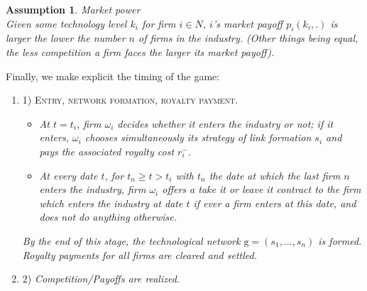 \documentclass{article}
\newtheorem{assumption}{Assumption}
\begin{document}
\begin{assumption}{Market power}\label{ass3}\\
Given some technology level $k_i$ for firm $i\in N$, $i$'s market payoff $p_i(k_i,.)$ is larger the lower the number $n$ of firms in the industry. (Other things being equal, the less competition a firm faces the larger its market payoff). 
\end{assumption}

\indent Finally, we make explicit the timing of the game:       

\begin{enumerate}
    \item[] \textsc{1) Entry, network formation, royalty payment.}
\begin{itemize}
\item  \textit{At $t=t_i$, firm $\omega_i$ decides whether it enters the industry or not; if it enters, $\omega_i$ chooses simultaneously its strategy of link formation $s_i$ and pays the associated royalty cost $r^-_i$. }
\item \textit{At every date $t$, for $t_n \geq t>t_i$ with $t_n$ the date at which the last firm $n$ enters the industry, firm $\omega_i$ offers a take it or leave it contract to the firm which enters the industry at date $t$ if ever a firm enters at this date, and does not do anything otherwise. }
  \end{itemize}
\textit{By the end of this stage, the technological network $\text{g}=(s_1,\ldots,s_n)$ is formed. Royalty payments for all firms are cleared and settled.}
    \item[] \textsc{2)} \textit{Competition/Payoffs are realized.}

\end{enumerate}  


  
\end{document}
